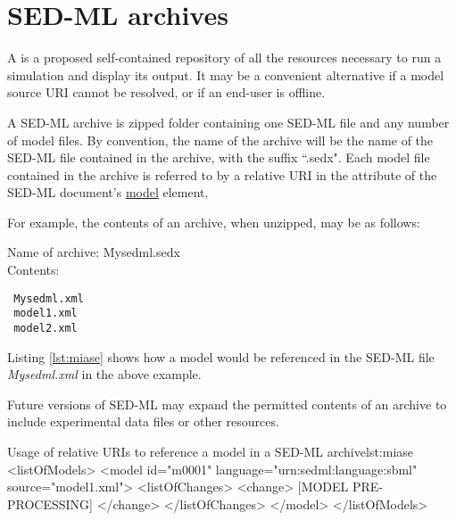\chapter{SED-ML archives}
\label{app:archive} 
A  is a proposed  self-contained repository of all the resources necessary to run a simulation and display its output. It may be a convenient alternative if a model  source URI cannot be resolved,  or if an end-user is offline. 

A SED-ML archive is zipped folder containing one SED-ML file and any number of model files. By convention,
 the name of the archive will be the name of the SED-ML file contained in the archive, with the suffix ``.sedx". Each model file contained in the archive is  referred to  by a relative URI  in the  attribute of the SED-ML document's  \hyperref[class:model]{model} element.
 
 For example, the contents of  an archive, when unzipped, may be as follows:
 
 Name of archive: Mysedml.sedx\\
 Contents: 
 \begin{verbatim}
 Mysedml.xml
 model1.xml
 model2.xml
 \end{verbatim}
 Listing \ref{lst:miase} shows how a model would be referenced in the SED-ML file \emph{Mysedml.xml} in the above example.
 
 Future versions of SED-ML may expand the permitted contents of an archive to include experimental data files or other resources.
%
\begin{myXmlLst}{Usage of relative URIs to reference a model in a SED-ML archive}{lst:miase}
<listOfModels>
 <model id="m0001" language="urn:sedml:language:sbml" 
  source="model1.xml">
  <listOfChanges>
   <change>
    [MODEL PRE-PROCESSING]
   </change>
   </listOfChanges> 
 </model>
</listOfModels>
\end{myXmlLst} 
%




